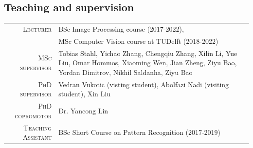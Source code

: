 \documentclass[a4paper, oneside, final]{scrartcl}
\begin{document}
\begin{center}
		\section{Teaching and supervision}
		\begin{tabular}{r@{\hskip 0.3in}p{12.3cm}}
			\textsc{Lecturer}		            & BSc Image Processing course (2017-2022),\\
                                                & MSc Computer Vision course at TUDelft (2018-2022)\\
			\textsc{MSc supervisor}             & Tobias Stahl, Yichao Zhang, Chengqiu Zhang, Xilin Li, Yue Liu, Omar Hommos, Xiaoming Wen, Jian Zheng, Ziyu Bao, Yordan Dimitrov, Nikhil Saldanha, Ziyu Bao\\
			\textsc{PhD supervisor}             & Vedran Vukotic (visting student), Abolfazi Nadi (visiting student), Xin Liu\\ 
			\textsc{PhD copromotor}             & Dr. Yancong Lin\\ 
            \textsc{Teaching Assistant}         & BSc Short Course on Pattern Recognition (2017-2019)\\
		\end{tabular}

\end{center}
\end{document}
